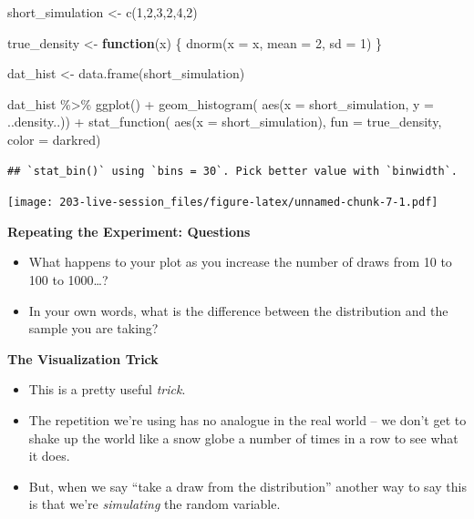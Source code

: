 \documentclass[
]{book}
\newenvironment{Shaded}{\begin{snugshade}}{\end{snugshade}}
\newcommand{\AttributeTok}[1]{\textcolor[rgb]{0.77,0.63,0.00}{#1}}
\newcommand{\ControlFlowTok}[1]{\textcolor[rgb]{0.13,0.29,0.53}{\textbf{#1}}}
\newcommand{\DecValTok}[1]{\textcolor[rgb]{0.00,0.00,0.81}{#1}}
\newcommand{\FunctionTok}[1]{\textcolor[rgb]{0.00,0.00,0.00}{#1}}
\newcommand{\NormalTok}[1]{#1}
\newcommand{\OtherTok}[1]{\textcolor[rgb]{0.56,0.35,0.01}{#1}}
\newcommand{\SpecialCharTok}[1]{\textcolor[rgb]{0.00,0.00,0.00}{#1}}
\newcommand{\StringTok}[1]{\textcolor[rgb]{0.31,0.60,0.02}{#1}}
\providecommand{\tightlist}{%
  \setlength{\itemsep}{0pt}\setlength{\parskip}{0pt}}
\theoremstyle{definition}
\theoremstyle{definition}
\theoremstyle{definition}
\theoremstyle{definition}
\theoremstyle{remark}
\begin{document}
\begin{Shaded}
\begin{Highlighting}[]
\NormalTok{short\_simulation }\OtherTok{\textless{}{-}}  \FunctionTok{c}\NormalTok{(}\DecValTok{1}\NormalTok{,}\DecValTok{2}\NormalTok{,}\DecValTok{3}\NormalTok{,}\DecValTok{2}\NormalTok{,}\DecValTok{4}\NormalTok{,}\DecValTok{2}\NormalTok{)}

\NormalTok{true\_density }\OtherTok{\textless{}{-}} \ControlFlowTok{function}\NormalTok{(x) \{}
  \FunctionTok{dnorm}\NormalTok{(}\AttributeTok{x =}\NormalTok{ x, }\AttributeTok{mean =} \DecValTok{2}\NormalTok{, }\AttributeTok{sd =} \DecValTok{1}\NormalTok{)}
\NormalTok{  \}}

\NormalTok{dat\_hist }\OtherTok{\textless{}{-}} \FunctionTok{data.frame}\NormalTok{(short\_simulation)}

\NormalTok{dat\_hist }\SpecialCharTok{\%\textgreater{}\%} 
  \FunctionTok{ggplot}\NormalTok{() }\SpecialCharTok{+} 
  \FunctionTok{geom\_histogram}\NormalTok{(}
    \FunctionTok{aes}\NormalTok{(}\AttributeTok{x =}\NormalTok{ short\_simulation, }\AttributeTok{y =}\NormalTok{ ..density..)) }\SpecialCharTok{+} 
  \FunctionTok{stat\_function}\NormalTok{(}
    \FunctionTok{aes}\NormalTok{(}\AttributeTok{x =}\NormalTok{ short\_simulation), }\AttributeTok{fun =}\NormalTok{ true\_density, }\AttributeTok{color =} \StringTok{\textquotesingle{}darkred\textquotesingle{}}\NormalTok{)}
\end{Highlighting}
\end{Shaded}

\begin{verbatim}
## `stat_bin()` using `bins = 30`. Pick better value with `binwidth`.
\end{verbatim}

\texttt{[image: 203-live-session\_files/figure-latex/unnamed-chunk-7-1.pdf]}

\textbf{Repeating the Experiment: Questions}

\begin{itemize}
\tightlist
\item
  What happens to your plot as you increase the number of draws from 10 to 100 to 1000\ldots?
\item
  In your own words, what is the difference between the distribution and the sample you are taking?
\end{itemize}

\textbf{The Visualization Trick}

\begin{itemize}
\tightlist
\item
  This is a pretty useful \emph{trick}.\\
\item
  The repetition we're using has no analogue in the real world -- we don't get to shake up the world like a snow globe a number of times in a row to see what it does.
\item
  But, when we say ``take a draw from the distribution'' another way to say this is that we're \emph{simulating} the random variable.
\end{itemize}
\end{document}
